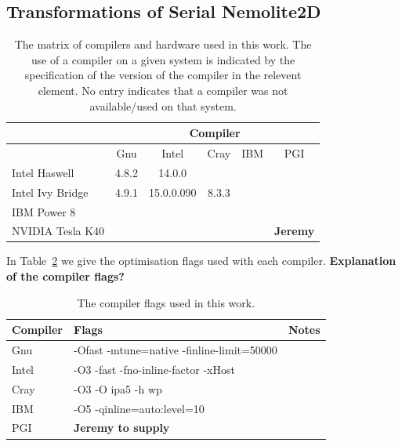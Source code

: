\documentclass[journal]{IEEEtran}
\newcommand{\psykal}{{PS}y{KA}l\ }
\begin{document}
\subsection{Transformations of Serial Nemolite2D}

%
\begin{table}[!t]
\renewcommand{\arraystretch}{1.3}
\caption{The matrix of compilers and hardware used in this work. The
  use of a compiler on a given system is indicated by the specification
  of the version of the compiler in the relevent element. No entry
  indicates that a compiler was not available/used on that system.}
\label{TABLE_compilers}
\centering
\begin{tabular}{|l|c|c|c|c|c|}
\hline
                 & \multicolumn{5}{c|}{Compiler}            \\
\hline
                 & Gnu   & Intel       & Cray    & IBM    &  PGI \\
\hline
Intel Haswell    & 4.8.2 & 14.0.0      &         &        &  \\
Intel Ivy Bridge & 4.9.1 & 15.0.0.090  & 8.3.3   &        &  \\
IBM Power 8      &       &             &         &        &  \\
NVIDIA Tesla K40 &       &             &         &        &  {\bf Jeremy} \\
\hline
\end{tabular}
\end{table}

In Table~\ref{TABLE_compiler_flags} we give the optimisation flags
used with each compiler. {\bf Explanation of the compiler flags?}
 
\begin{table}[!t]
\renewcommand{\arraystretch}{1.3}
\caption{The compiler flags used in this work.}
\label{TABLE_compiler_flags}
\centering
\begin{tabular}{l|l|l}
\hline
Compiler  &  Flags                                    & Notes \\
\hline
Gnu       & -Ofast -mtune=native -finline-limit=50000 &   \\
Intel     & -O3 -fast -fno-inline-factor -xHost       &   \\
Cray      & -O3 -O ipa5 -h wp                         &   \\
IBM       & -O5 -qinline=auto:level=10                &   \\
PGI       & {\bf Jeremy to supply}                    &   \\
\hline
\end{tabular}
\end{table}
\end{document}
